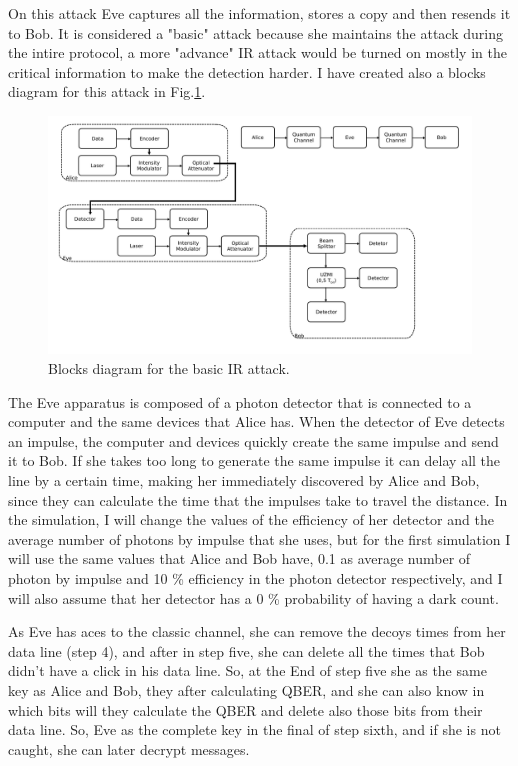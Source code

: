 \begin{refsection}
On this attack Eve captures all the information, stores a copy and then resends it to Bob. It is considered a "basic" attack because she maintains the attack during the intire protocol, a more "advance" IR attack would be turned on mostly in the critical information to make the detection harder. I have created also a blocks diagram for this attack in Fig.\ref{fig:bloc}.

\begin{figure}[h]
\centering
\includegraphics[width=1\linewidth]{./sdf/tq_76558_cow_protocol/slides/figures/Diagrama_de_blocos.pdf}
\caption{Blocks diagram for the basic IR attack.}
\label{fig:bloc}
\end{figure}

The Eve apparatus is composed of a photon detector that is connected to a computer and the same devices that Alice has. When the detector of Eve detects an impulse, the computer and devices quickly create the same impulse and send it to Bob. If she takes too long to generate the same impulse it can delay all the line by a certain time, making her immediately discovered by Alice and Bob, since they can calculate the time that the impulses take to travel the distance. In the simulation, I will change the values of the efficiency of her detector and the average number of photons by impulse that she uses, but for the first simulation I will use the same values that Alice and Bob have, 0.1 as average number of photon by impulse and 10 \% efficiency in the photon detector respectively, and I will also assume that her detector has a 0 \% probability of having a dark count.

As Eve has aces to the classic channel, she can remove the decoys times from her data line (step 4), and after in step five, she can delete all the times that Bob didn't have a click in his data line. So, at the End of step five she as the same key as Alice and Bob, they after calculating QBER, and she can also know in which bits will they calculate the QBER and delete also those bits from their data line. So, Eve as the complete key in the final of step sixth, and if she is not caught, she can later decrypt messages.


\end{refsection}
